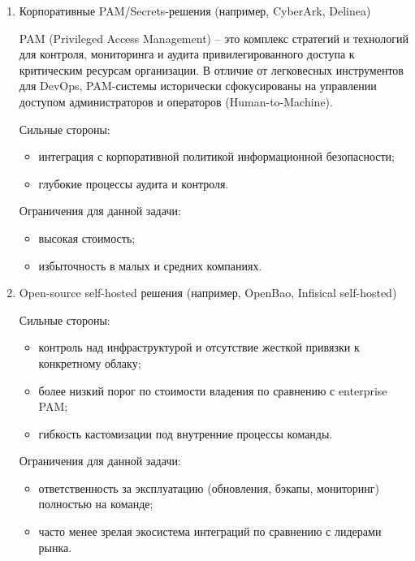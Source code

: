 \documentclass[14pt, a4paper]{extarticle}
\begin{document}
\begin{enumerate}
	Ограничения для данной задачи:
	
	\begin{itemize}
	\item привязка к конкретному облачному провайдеру;
	\item зависимость от внешней инфраструктуры.
	\end{itemize}
	
	\item Корпоративные PAM/Secrets-решения (например, CyberArk, Delinea)
	
	PAM (Privileged Access Management) -- это комплекс стратегий и технологий для контроля, мониторинга и аудита привилегированного доступа к критическим ресурсам организации. В отличие от легковесных инструментов для DevOps, PAM-системы исторически сфокусированы на управлении доступом администраторов и операторов (Human-to-Machine).

	Сильные стороны:
	
	\begin{itemize}
	\item интеграция с корпоративной политикой информационной безопасности;
	\item глубокие процессы аудита и контроля.
	\end{itemize}
	
	Ограничения для данной задачи:
	
	\begin{itemize}
	\item высокая стоимость;
	\item избыточность в малых и средних компаниях.
	\end{itemize}
	
	\item Open-source self-hosted решения (например, OpenBao, Infisical self-hosted)
	
	Сильные стороны:
	
	\begin{itemize}
	\item контроль над инфраструктурой и отсутствие жесткой привязки к конкретному облаку;
	\item более низкий порог по стоимости владения по сравнению с enterprise PAM;
	\item гибкость кастомизации под внутренние процессы команды.
	\end{itemize}
	
	Ограничения для данной задачи:
	
	\begin{itemize}
	\item ответственность за эксплуатацию (обновления, бэкапы, мониторинг) полностью на команде;
	\item часто менее зрелая экосистема интеграций по сравнению с лидерами рынка.
	\end{itemize}
	

\end{enumerate}
\end{document}
